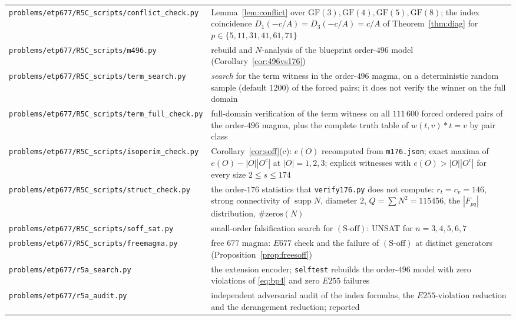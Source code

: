 \documentclass[11pt]{article}
\theoremstyle{plain}
\theoremstyle{definition}
\theoremstyle{remark}
\numberwithin{equation}{section}
\newcommand{\op}{\mathbin{*}}
\newcommand{\supp}{\operatorname{supp}}
\begin{document}
\begin{longtable}{p{}p{}}
\texttt{problems\slash etp677\slash R5C\_scripts\slash conflict\_check.py} & Lemma~\ref{lem:conflict} over
$\mathrm{GF}(3),\mathrm{GF}(4),\mathrm{GF}(5),\mathrm{GF}(8)$; the index coincidence
$D_1(-c/A) = D_3(-c/A) = c/A$ of Theorem~\ref{thm:diag} for
$p\in\{5,11,31,41,61,71\}$\\
\texttt{problems\slash etp677\slash R5C\_scripts\slash m496.py} & rebuild and $N$-analysis of the blueprint
order-$496$ model (Corollary~\ref{cor:496vs176})\\
\texttt{problems\slash etp677\slash R5C\_scripts\slash term\_search.py} & \emph{search} for the term witness in
the order-$496$ magma, on a deterministic random sample (default $1200$) of the forced pairs;
it does not verify the winner on the full domain\\
\texttt{problems\slash etp677\slash R5C\_scripts\slash term\_full\_check.py} & full-domain verification of the
term witness on all $111\,600$ forced ordered pairs of the order-$496$ magma, plus the
complete truth table of $w(t,v)\op t = v$ by pair class\\
\texttt{problems\slash etp677\slash R5C\_scripts\slash isoperim\_check.py} & Corollary~\ref{cor:soff}(c):
$e(O)$ recomputed from \texttt{m176.json}; exact maxima of $e(O)-|O||O^c|$ at $|O|=1,2,3$;
explicit witnesses with $e(O)>|O||O^c|$ for every size $2\le s\le 174$\\
\texttt{problems\slash etp677\slash R5C\_scripts\slash struct\_check.py} & the order-$176$ statistics that
\texttt{verify176.py} does not compute: $r_t = c_v = 146$, strong connectivity of $\supp N$,
diameter $2$, $Q = \sum N^2 = 115456$, the $|F_{pq}|$ distribution, $\#\mathrm{zeros}(N)$\\
\texttt{problems\slash etp677\slash R5C\_scripts\slash soff\_sat.py} & small-order falsification search for
$(\mathrm{S\text{-}off})$: UNSAT for $n=3,4,5,6,7$\\
\texttt{problems\slash etp677\slash R5C\_scripts\slash freemagma.py} & free $677$ magma: $E677$ check and the
failure of $(\mathrm{S\text{-}off})$ at distinct generators
(Proposition~\ref{prop:freesoff})\\
\texttt{problems\slash etp677\slash r5a\_search.py} & the extension encoder; \texttt{selftest} rebuilds
the order-$496$ model with zero violations of \eqref{eq:bp4} and zero $E255$ failures\\
\texttt{problems\slash etp677\slash r5a\_audit.py} & independent adversarial audit of the index
formulas, the $E255$-violation reduction and the derangement reduction; reported

\end{longtable}
\end{document}
